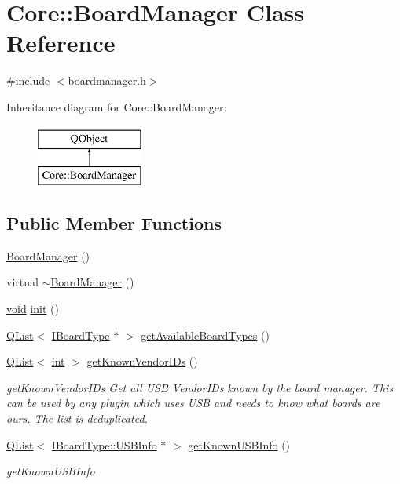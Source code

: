 \hypertarget{class_core_1_1_board_manager}{\section{Core\-:\-:Board\-Manager Class Reference}
\label{class_core_1_1_board_manager}
}


{\ttfamily \#include $<$boardmanager.\-h$>$}

Inheritance diagram for Core\-:\-:Board\-Manager\-:\begin{figure}[H]
\begin{center}
\leavevmode
\includegraphics[height=2.000000cm]{class_core_1_1_board_manager}
\end{center}
\end{figure}
\subsection*{Public Member Functions}
\begin{DoxyCompactItemize}
\item 
\hyperlink{group___core_plugin_ga4f2c52bc9064410a9ea3b15de6b3b172}{Board\-Manager} ()
\item 
virtual \hyperlink{group___core_plugin_gaceb91bd6e1ee469d9043e6295ad404fa}{$\sim$\-Board\-Manager} ()
\item 
\hyperlink{group___u_a_v_objects_plugin_ga444cf2ff3f0ecbe028adce838d373f5c}{void} \hyperlink{group___core_plugin_gabd392f7c64fd19944b464465e3ed3ecd}{init} ()
\item 
\hyperlink{class_q_list}{Q\-List}$<$ \hyperlink{class_core_1_1_i_board_type}{I\-Board\-Type} $\ast$ $>$ \hyperlink{group___core_plugin_ga4278ca31ed4ae32d6da4c5ccd43ceb4a}{get\-Available\-Board\-Types} ()
\item 
\hyperlink{class_q_list}{Q\-List}$<$ \hyperlink{ioapi_8h_a787fa3cf048117ba7123753c1e74fcd6}{int} $>$ \hyperlink{group___core_plugin_gaa37a0c8c804e3623c622cf8243bc7ef3}{get\-Known\-Vendor\-I\-Ds} ()
\begin{DoxyCompactList}\small\item\em get\-Known\-Vendor\-I\-Ds Get all U\-S\-B Vendor\-I\-Ds known by the board manager. This can be used by any plugin which uses U\-S\-B and needs to know what boards are ours. The list is deduplicated. \end{DoxyCompactList}\item 
\hyperlink{class_q_list}{Q\-List}$<$ \hyperlink{struct_core_1_1_i_board_type_1_1_u_s_b_info}{I\-Board\-Type\-::\-U\-S\-B\-Info} $\ast$ $>$ \hyperlink{group___core_plugin_ga37e132b8ad41b05157fcd29b679ce713}{get\-Known\-U\-S\-B\-Info} ()
\begin{DoxyCompactList}\small\item\em get\-Known\-U\-S\-B\-Info \end{DoxyCompactList}\end{DoxyCompactItemize}
